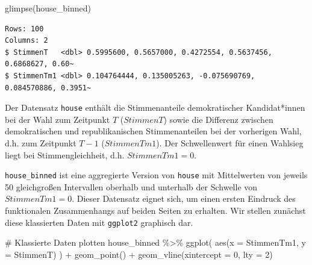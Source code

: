 \documentclass[
  a4paper,
  DIV=11,
  oneside]{scrreprt}
\newenvironment{Shaded}{\begin{snugshade}}{\end{snugshade}}
\newcommand{\AttributeTok}[1]{\textcolor[rgb]{0.40,0.45,0.13}{#1}}
\newcommand{\CommentTok}[1]{\textcolor[rgb]{0.37,0.37,0.37}{#1}}
\newcommand{\DecValTok}[1]{\textcolor[rgb]{0.68,0.00,0.00}{#1}}
\newcommand{\FunctionTok}[1]{\textcolor[rgb]{0.28,0.35,0.67}{#1}}
\newcommand{\NormalTok}[1]{\textcolor[rgb]{0.00,0.23,0.31}{#1}}
\newcommand{\SpecialCharTok}[1]{\textcolor[rgb]{0.37,0.37,0.37}{#1}}
\begin{document}
\begin{Shaded}
\begin{Highlighting}[]
\FunctionTok{glimpse}\NormalTok{(house\_binned)}
\end{Highlighting}
\end{Shaded}

\begin{verbatim}
Rows: 100
Columns: 2
$ StimmenT   <dbl> 0.5995600, 0.5657000, 0.4272554, 0.5637456, 0.6868627, 0.60~
$ StimmenTm1 <dbl> 0.104764444, 0.135005263, -0.075690769, 0.084570886, 0.3951~
\end{verbatim}

Der Datensatz \texttt{house} enthält die Stimmenanteile demokratischer
Kandidat*innen bei der Wahl zum Zeitpunkt \(T\) (\(StimmenT\)) sowie die
Differenz zwischen demokratischen und republikanischen Stimmenanteilen
bei der vorherigen Wahl, d.h. zum Zeitpunkt \(T-1\) (\(StimmenTm1\)).
Der Schwellenwert für einen Wahlsieg liegt bei Stimmengleichheit, d.h.
\(StimmenTm1 = 0\).

\texttt{house\_binned} ist eine aggregierte Version von \texttt{house}
mit Mittelwerten von jeweils 50 gleichgroßen Intervallen oberhalb und
unterhalb der Schwelle von \(StimmenTm1 = 0\). Dieser Datensatz eignet
sich, um einen ersten Eindruck des funktionalen Zusammenhangs auf beiden
Seiten zu erhalten. Wir stellen zunächst diese klassierten Daten mit
\texttt{ggplot2} graphisch dar.

\begin{Shaded}
\begin{Highlighting}[]
\CommentTok{\# Klassierte Daten plotten}
\NormalTok{house\_binned }\SpecialCharTok{\%\textgreater{}\%}
  \FunctionTok{ggplot}\NormalTok{(}
    \FunctionTok{aes}\NormalTok{(}\AttributeTok{x =}\NormalTok{ StimmenTm1, }\AttributeTok{y =}\NormalTok{ StimmenT)}
\NormalTok{    ) }\SpecialCharTok{+}
  \FunctionTok{geom\_point}\NormalTok{() }\SpecialCharTok{+}
  \FunctionTok{geom\_vline}\NormalTok{(}\AttributeTok{xintercept =} \DecValTok{0}\NormalTok{, }\AttributeTok{lty =} \DecValTok{2}\NormalTok{)}
\end{Highlighting}
\end{Shaded}
\end{document}
